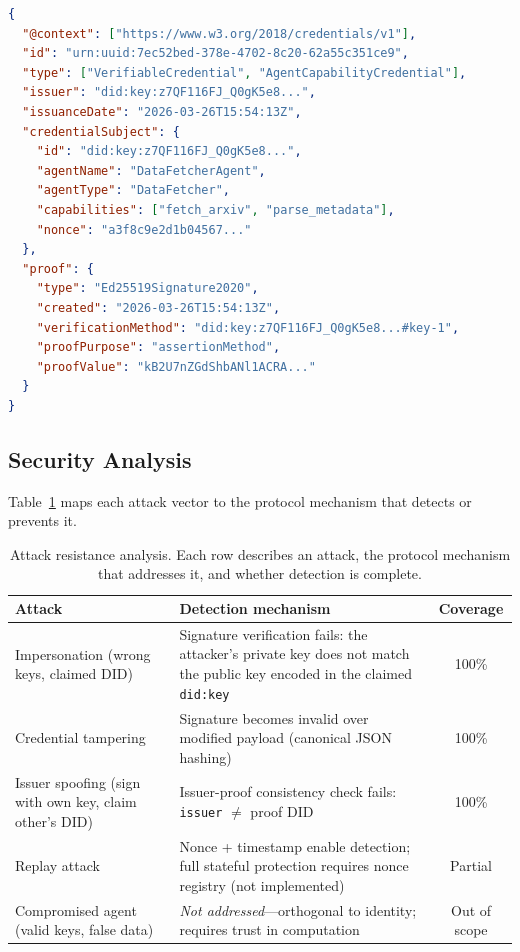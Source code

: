 \documentclass[11pt]{article}
\newcommand{\didkey}{\texttt{did:key}}
\begin{document}
\begin{lstlisting}[language=json, caption={Example AgentCapabilityCredential (abbreviated).}, label={lst:vc}, float=t]
{
  "@context": ["https://www.w3.org/2018/credentials/v1"],
  "id": "urn:uuid:7ec52bed-378e-4702-8c20-62a55c351ce9",
  "type": ["VerifiableCredential", "AgentCapabilityCredential"],
  "issuer": "did:key:z7QF116FJ_Q0gK5e8...",
  "issuanceDate": "2026-03-26T15:54:13Z",
  "credentialSubject": {
    "id": "did:key:z7QF116FJ_Q0gK5e8...",
    "agentName": "DataFetcherAgent",
    "agentType": "DataFetcher",
    "capabilities": ["fetch_arxiv", "parse_metadata"],
    "nonce": "a3f8c9e2d1b04567..."
  },
  "proof": {
    "type": "Ed25519Signature2020",
    "created": "2026-03-26T15:54:13Z",
    "verificationMethod": "did:key:z7QF116FJ_Q0gK5e8...#key-1",
    "proofPurpose": "assertionMethod",
    "proofValue": "kB2U7nZGdShbANl1ACRA..."
  }
}
\end{lstlisting}

\subsection{Security Analysis}

Table~\ref{tab:attacks} maps each attack vector to the protocol mechanism that detects or prevents it.

\begin{table}[t]
\centering
\caption{Attack resistance analysis. Each row describes an attack, the protocol mechanism that addresses it, and whether detection is complete.}
\label{tab:attacks}
\begin{tabular}{@{}p{2.8cm}p{5.5cm}c@{}}
\toprule
\textbf{Attack} & \textbf{Detection mechanism} & \textbf{Coverage} \\
\midrule
Impersonation (wrong keys, claimed DID) & Signature verification fails: the attacker's private key does not match the public key encoded in the claimed \didkey{} & 100\% \\
\addlinespace
Credential tampering & Signature becomes invalid over modified payload (canonical JSON hashing) & 100\% \\
\addlinespace
Issuer spoofing (sign with own key, claim other's DID) & Issuer-proof consistency check fails: \texttt{issuer} $\neq$ proof DID & 100\% \\
\addlinespace
Replay attack & Nonce + timestamp enable detection; full stateful protection requires nonce registry (not implemented) & Partial \\
\addlinespace
Compromised agent (valid keys, false data) & \emph{Not addressed}---orthogonal to identity; requires trust in computation & Out of scope \\
\bottomrule
\end{tabular}
\end{table}
\end{document}

